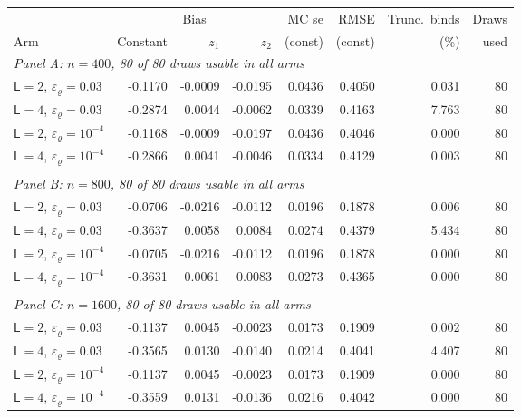\begin{tabular}{lrrrrrrr}
\toprule
 & \multicolumn{3}{c}{Bias} & MC se & RMSE & Trunc.\ binds & Draws \\
\cmidrule(lr){2-4}
Arm & Constant & $z_1$ & $z_2$ & (const) & (const) & (\%) & used \\
\midrule
\multicolumn{8}{l}{\textit{Panel A: $n = 400$, 80 of 80 draws usable in all arms}} \\
\midrule
\quad $\mathsf L = 2$, $\varepsilon_\varrho = 0.03$ & -0.1170 & -0.0009 & -0.0195 & 0.0436 & 0.4050 & 0.031 & 80 \\
\quad $\mathsf L = 4$, $\varepsilon_\varrho = 0.03$ & -0.2874 & 0.0044 & -0.0062 & 0.0339 & 0.4163 & 7.763 & 80 \\
\quad $\mathsf L = 2$, $\varepsilon_\varrho = 10^{-4}$ & -0.1168 & -0.0009 & -0.0197 & 0.0436 & 0.4046 & 0.000 & 80 \\
\quad $\mathsf L = 4$, $\varepsilon_\varrho = 10^{-4}$ & -0.2866 & 0.0041 & -0.0046 & 0.0334 & 0.4129 & 0.003 & 80 \\
\\[0.3em]
\multicolumn{8}{l}{\textit{Panel B: $n = 800$, 80 of 80 draws usable in all arms}} \\
\midrule
\quad $\mathsf L = 2$, $\varepsilon_\varrho = 0.03$ & -0.0706 & -0.0216 & -0.0112 & 0.0196 & 0.1878 & 0.006 & 80 \\
\quad $\mathsf L = 4$, $\varepsilon_\varrho = 0.03$ & -0.3637 & 0.0058 & 0.0084 & 0.0274 & 0.4379 & 5.434 & 80 \\
\quad $\mathsf L = 2$, $\varepsilon_\varrho = 10^{-4}$ & -0.0705 & -0.0216 & -0.0112 & 0.0196 & 0.1878 & 0.000 & 80 \\
\quad $\mathsf L = 4$, $\varepsilon_\varrho = 10^{-4}$ & -0.3631 & 0.0061 & 0.0083 & 0.0273 & 0.4365 & 0.000 & 80 \\
\\[0.3em]
\multicolumn{8}{l}{\textit{Panel C: $n = 1600$, 80 of 80 draws usable in all arms}} \\
\midrule
\quad $\mathsf L = 2$, $\varepsilon_\varrho = 0.03$ & -0.1137 & 0.0045 & -0.0023 & 0.0173 & 0.1909 & 0.002 & 80 \\
\quad $\mathsf L = 4$, $\varepsilon_\varrho = 0.03$ & -0.3565 & 0.0130 & -0.0140 & 0.0214 & 0.4041 & 4.407 & 80 \\
\quad $\mathsf L = 2$, $\varepsilon_\varrho = 10^{-4}$ & -0.1137 & 0.0045 & -0.0023 & 0.0173 & 0.1909 & 0.000 & 80 \\
\quad $\mathsf L = 4$, $\varepsilon_\varrho = 10^{-4}$ & -0.3559 & 0.0131 & -0.0136 & 0.0216 & 0.4042 & 0.000 & 80 \\
\bottomrule
\end{tabular}
